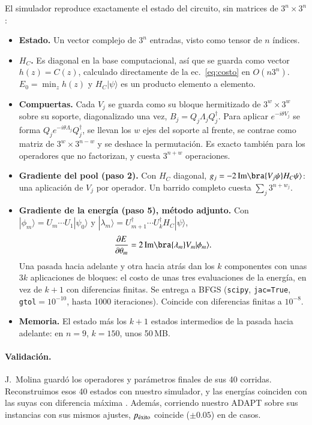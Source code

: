 \documentclass[11pt,a4paper]{article}
\newcommand{\pex}{p_{\rm \acute{e}xito}}
\renewcommand{\ket}[1]{|#1\rangle}
\begin{document}
El simulador reproduce exactamente el estado del circuito, sin matrices de $3^n\times3^n$:
\begin{itemize}
\item \textbf{Estado.} Un vector complejo de $3^n$ entradas, visto como tensor de $n$ índices.
\item \textbf{$H_C$.} Es diagonal en la base computacional, así que se guarda como vector
  $h(z)=C(z)$, calculado directamente de la ec.~\eqref{eq:costo} en $O(n3^n)$. $E_0=\min_zh(z)$
  y $H_C\ket\psi$ es un producto elemento a elemento.
\item \textbf{Compuertas.} Cada $V_j$ se guarda como su bloque hermitizado de $3^w\times3^w$ sobre
  su soporte, diagonalizado una vez, $B_j=Q_j\Lambda_jQ_j^\dagger$. Para aplicar
  $e^{-i\theta V_j}$ se forma $Q_je^{-i\theta\Lambda_j}Q_j^\dagger$, se llevan los $w$ ejes del
  soporte al frente, se contrae como matriz de $3^w\times3^{n-w}$ y se deshace la permutación. Es
  exacto también para los operadores que no factorizan, y cuesta $3^{n+w}$ operaciones.
\item \textbf{Gradiente del pool (paso 2).} Con $H_C$ diagonal,
  $g_j=-2\,{\rm Im}\bra{V_j\psi}H_C\psi\rangle$: una aplicación de $V_j$ por operador. Un barrido
  completo cuesta $\sum_j3^{n+w_j}$.
\item \textbf{Gradiente de la energía (paso 5), método adjunto.} Con
  $\ket{\phi_m}=U_m\cdots U_1\ket{\psi_0}$ y $\ket{\lambda_m}=U_{m+1}^\dagger\cdots U_k^\dagger H_C\ket{\psi}$,
  \begin{equation}
    \frac{\partial E}{\partial\theta_m}=2\,{\rm Im}\bra{\lambda_m}V_m\ket{\phi_m}.
  \end{equation}
  Una pasada hacia adelante y otra hacia atrás dan los $k$ componentes con unas $3k$
  aplicaciones de bloques: el costo de unas tres evaluaciones de la energía, en vez de $k+1$ con
  diferencias finitas. Se entrega a BFGS (\texttt{scipy}, \texttt{jac=True},
  \texttt{gtol}$=10^{-10}$, hasta 1000 iteraciones). Coincide con diferencias finitas a
  $10^{-8}$.
\item \textbf{Memoria.} El estado más los $k+1$ estados intermedios de la pasada hacia adelante:
  en $n=9$, $k=150$, unos 50\,MB.
\end{itemize}

\paragraph{Validación.} J.~Molina guardó los operadores y parámetros finales de sus 40 corridas.
Reconstruimos esos 40 estados con nuestro simulador, y las energías coinciden con las suyas con
diferencia máxima \SanidadMaxDif. Además, corriendo nuestro ADAPT sobre sus instancias con sus
mismos ajustes, $\pex$ coincide ($\pm0.05$) en \CompEmpates{} de \CompTotal{} casos.
\end{document}
